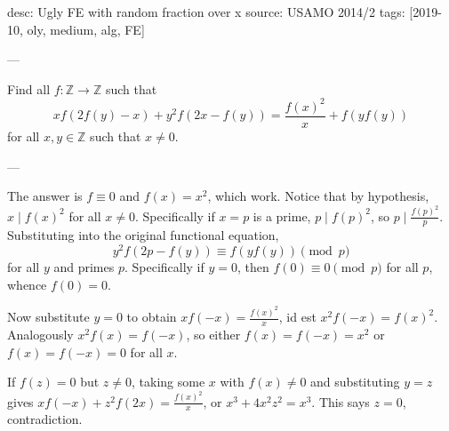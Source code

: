 desc: Ugly FE with random fraction over x
source: USAMO 2014/2
tags: [2019-10, oly, medium, alg, FE]

---

Find all $f:\mathbb Z\to\mathbb Z$ such that \[xf(2f(y)-x)+y^2f(2x-f(y))=\frac{f(x)^2}x+f(yf(y))\]
for all $x,y\in\mathbb Z$ such that $x\ne0$.

---

The answer is $f\equiv0$ and $f(x)=x^2$, which work. Notice that by hypothesis, $x\mid f(x)^2$ for all $x\ne0$. Specifically if $x=p$ is a prime, $p\mid f(p)^2$, so $p\mid\frac{f(p)^2}p$. Substituting into the original functional equation, \[y^2f(2p-f(y))\equiv f(yf(y))\pmod p\]
for all $y$ and primes $p$. Specifically if $y=0$, then $f(0)\equiv0\pmod p$ for all $p$, whence $f(0)=0$.

Now substitute $y=0$ to obtain $xf(-x)=\frac{f(x)^2}x$, id est $x^2f(-x)=f(x)^2$. Analogously $x^2f(x)=f(-x)$, so either $f(x)=f(-x)=x^2$ or $f(x)=f(-x)=0$ for all $x$.

If $f(z)=0$ but $z\ne0$, taking some $x$ with $f(x)\ne0$ and substituting $y=z$ gives $xf(-x)+z^2f(2x)=\frac{f(x)^2}x$, or $x^3+4x^2z^2=x^3$. This says $z=0$, contradiction.
